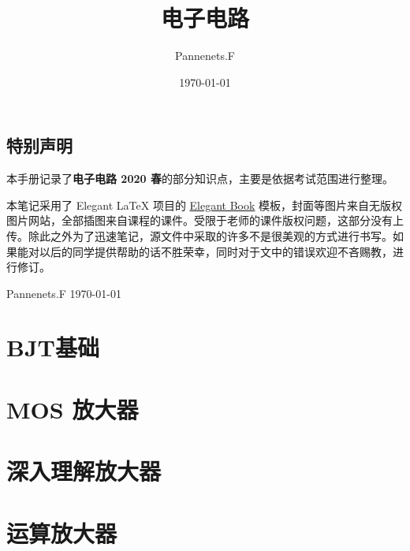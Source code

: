 \documentclass[cn,11pt,chinese,black,simple]{elegantbook}
\title{电子电路}
\author{Pannenets.F}
\date{\today}
\begin{document}
\maketitle
\frontmatter

\chapter*{特别声明}

本手册记录了\textbf{电子电路 2020 春}的部分知识点，主要是依据考试范围进行整理。

本笔记采用了 Elegant \LaTeX{} 项目的 \href{https://github.com/ElegantLaTeX/ElegantBook}{Elegant Book} 模板，封面等图片来自无版权图片网站，全部插图来自课程的课件。受限于老师的课件版权问题，这部分没有上传。除此之外为了迅速笔记，源文件中采取的许多不是很美观的方式进行书写。如果能对以后的同学提供帮助的话不胜荣幸，同时对于文中的错误欢迎不吝赐教，进行修订。

\vskip 1.5cm


\begin{flushright}
Pannenets.F
\today
\end{flushright}

\tableofcontents

\mainmatter

\part{BJT基础}



\part{MOS 放大器}







\part{深入理解放大器}







\part{运算放大器}





\appendix

\addappheadtotoc


\end{document}
